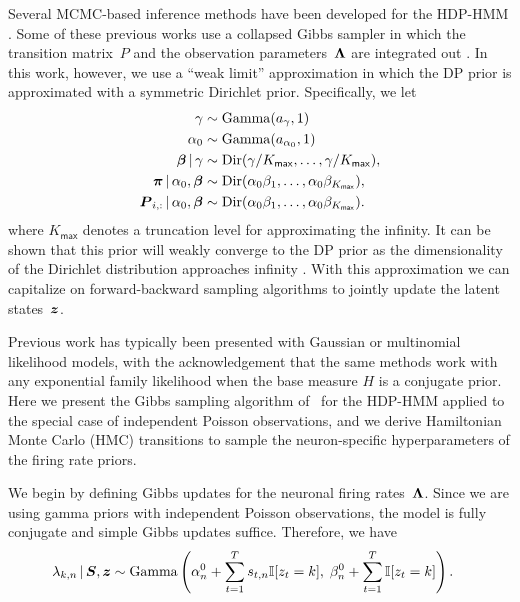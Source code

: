 Several MCMC-based inference methods have been developed for the
HDP-HMM \citep{Beal02,Teh06,van08}. Some of these previous works use a
collapsed Gibbs sampler in which the transition matrix~$P$ and the
observation parameters~$\boldsymbol{\Lambda}$ are integrated out
\citep{Teh06,van08}. In this work, however, we use a ``weak limit''
approximation in which the DP prior is approximated with a symmetric
Dirichlet prior. Specifically, we let
\begin{align}
\label{eq:hdphmm_trans}
\gamma &\sim \mathrm{Gamma}(a_\gamma, 1) \\
\nonumber \alpha_0 &\sim \mathrm{Gamma}(a_{\alpha_0}, 1) \\
\nonumber \boldsymbol{\beta} \,|\, \gamma &\sim \mathrm{Dir}(\gamma/K_{\mathsf{max}}, \ldots, \gamma/K_{\mathsf{max}}), \\
\nonumber \boldsymbol{\pi} \,|\, \alpha_0, \boldsymbol{\beta} &\sim \mathrm{Dir}(\alpha_0 \beta_1, \ldots, \alpha_0 \beta_{K_{\mathsf{max}}}), \\
\nonumber \boldsymbol{P}_{i,:} \,|\, \alpha_0, \boldsymbol{\beta} &\sim \mathrm{Dir}(\alpha_0 \beta_1, \ldots, \alpha_0 \beta_{K_{\mathsf{max}}}).
\end{align}
where $K_{\mathsf{max}}$ denotes a truncation level for approximating the infinity.  It can be
shown that this prior will weakly converge to the DP prior as the
dimensionality of the Dirichlet distribution approaches infinity
\citep{Johnson14, Ishwaran02}. With this approximation we can
capitalize on forward-backward sampling algorithms to jointly update
the latent states~$\boldsymbol{z}$.

Previous work has typically been presented with Gaussian or
multinomial likelihood models, with the acknowledgement that the same
methods work with any exponential family likelihood when the base
measure $H$ is a conjugate prior.  Here we present the Gibbs sampling
algorithm of~\citep{Teh06} for the HDP-HMM applied to the special case
of independent Poisson observations, and we derive Hamiltonian Monte
Carlo (HMC) transitions to sample the neuron-specific hyperparameters of
the firing rate priors.

We begin by defining Gibbs updates for the neuronal firing
rates~$\boldsymbol{\Lambda}$. Since we are using gamma priors with independent
Poisson observations, the model is fully conjugate and simple Gibbs
updates suffice. Therefore, we have
\begin{align}
\lambda_{k,n} \,|\, \boldsymbol{S}, \boldsymbol{z} 
  &\sim \mathrm{Gamma} \left(
    \alpha_n^0 + \sum_{t=1}^T s_{t,n} \mathbb{I}[z_t=k], \; 
    \beta_n^0 + \sum_{t=1}^T \mathbb{I}[z_t=k]
    \right).
\end{align}

